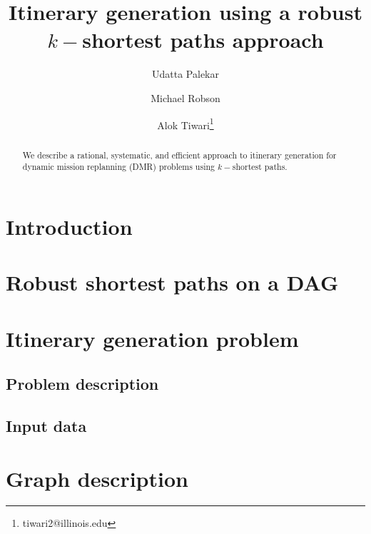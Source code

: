 \documentclass[8pt]{article}
\begin{document}
\title{Itinerary generation using a robust $k-$shortest paths approach}

\author[1]{Udatta Palekar}
\author[2]{Michael Robson}
\author[3]{Alok Tiwari\thanks{tiwari2@illinois.edu}}


\renewcommand\Authands{, and }


\maketitle
\begin{abstract}
We describe a rational, systematic, and efficient approach to itinerary generation for dynamic mission replanning (DMR) problems using $k-$shortest paths. 
\end{abstract}

\section{Introduction}\label{sec:intro}

\section{Robust shortest paths on a DAG}

\section{Itinerary generation problem}\label{sec:problem}
\subsection{Problem description}\label{subsec:desc}

\subsection{Input data}\label{subsec:data}

\section{Graph description}\label{sec:graph}
\end{document}
